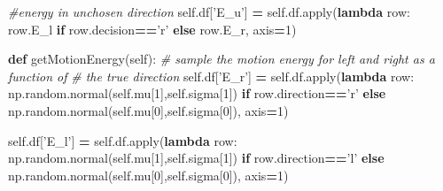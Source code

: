 \documentclass[12pt,twoside]{reedthesis}
\newenvironment{Shaded}{\begin{snugshade}}{\end{snugshade}}
\newcommand{\BuiltInTok}[1]{#1}
\newcommand{\CommentTok}[1]{\textcolor[rgb]{0.56,0.35,0.01}{\textit{#1}}}
\newcommand{\ControlFlowTok}[1]{\textcolor[rgb]{0.13,0.29,0.53}{\textbf{#1}}}
\newcommand{\DecValTok}[1]{\textcolor[rgb]{0.00,0.00,0.81}{#1}}
\newcommand{\KeywordTok}[1]{\textcolor[rgb]{0.13,0.29,0.53}{\textbf{#1}}}
\newcommand{\NormalTok}[1]{#1}
\newcommand{\OperatorTok}[1]{\textcolor[rgb]{0.81,0.36,0.00}{\textbf{#1}}}
\newcommand{\StringTok}[1]{\textcolor[rgb]{0.31,0.60,0.02}{#1}}
\newcommand{\VariableTok}[1]{\textcolor[rgb]{0.00,0.00,0.00}{#1}}
\begin{document}
\begin{Shaded}
\begin{Highlighting}[]
        \CommentTok{#energy in unchosen direction}
        \VariableTok{self}\NormalTok{.df[}\StringTok{'E_u'}\NormalTok{] }\OperatorTok{=} \VariableTok{self}\NormalTok{.df.}\BuiltInTok{apply}\NormalTok{(}\KeywordTok{lambda}\NormalTok{ row: }
\NormalTok{                                       row.E_l }\ControlFlowTok{if}\NormalTok{ row.decision}\OperatorTok{==}\StringTok{'r'} 
                                       \ControlFlowTok{else}\NormalTok{ row.E_r, axis}\OperatorTok{=}\DecValTok{1}\NormalTok{)}
        
    \KeywordTok{def}\NormalTok{ getMotionEnergy(}\VariableTok{self}\NormalTok{):}
    \CommentTok{# sample the motion energy for left and right as a function of }
    \CommentTok{# the true direction}
        \VariableTok{self}\NormalTok{.df[}\StringTok{'E_r'}\NormalTok{] }\OperatorTok{=} \VariableTok{self}\NormalTok{.df.}\BuiltInTok{apply}\NormalTok{(}\KeywordTok{lambda}\NormalTok{ row: }
\NormalTok{               np.random.normal(}\VariableTok{self}\NormalTok{.mu[}\DecValTok{1}\NormalTok{],}\VariableTok{self}\NormalTok{.sigma[}\DecValTok{1}\NormalTok{]) }
               \ControlFlowTok{if}\NormalTok{ row.direction}\OperatorTok{==}\StringTok{'r'} 
               \ControlFlowTok{else}\NormalTok{ np.random.normal(}\VariableTok{self}\NormalTok{.mu[}\DecValTok{0}\NormalTok{],}\VariableTok{self}\NormalTok{.sigma[}\DecValTok{0}\NormalTok{]),}
\NormalTok{               axis}\OperatorTok{=}\DecValTok{1}\NormalTok{)}

        \VariableTok{self}\NormalTok{.df[}\StringTok{'E_l'}\NormalTok{] }\OperatorTok{=} \VariableTok{self}\NormalTok{.df.}\BuiltInTok{apply}\NormalTok{(}\KeywordTok{lambda}\NormalTok{ row: }
\NormalTok{               np.random.normal(}\VariableTok{self}\NormalTok{.mu[}\DecValTok{1}\NormalTok{],}\VariableTok{self}\NormalTok{.sigma[}\DecValTok{1}\NormalTok{]) }
               \ControlFlowTok{if}\NormalTok{ row.direction}\OperatorTok{==}\StringTok{'l'} 
               \ControlFlowTok{else}\NormalTok{ np.random.normal(}\VariableTok{self}\NormalTok{.mu[}\DecValTok{0}\NormalTok{],}\VariableTok{self}\NormalTok{.sigma[}\DecValTok{0}\NormalTok{]),}
\NormalTok{               axis}\OperatorTok{=}\DecValTok{1}\NormalTok{)}
        

\end{Highlighting}
\end{Shaded}
\end{document}
